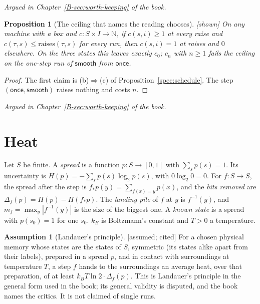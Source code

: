 \documentclass[11pt, a4paper]{article}
\theoremstyle{plain}
\newtheorem{proposition}[theorem]{Proposition}
\theoremstyle{definition}
\newtheorem{assumption}[theorem]{Assumption}
\theoremstyle{remark}
\newcommand{\N}{\mathbb{N}}
\newcommand{\cost}{c}
\newcommand{\inv}{^{-1}}
\newcommand{\argued}[1]{\par\noindent\textit{Argued in Chapter~\ref{B-#1} of the book.}\par}
\newcommand{\kind}[1]{\textup{[#1]}}
\begin{document}
\argued{sec:worth-keeping}

\begin{proposition}[The ceiling that names the reading chooses]\label{spec:ceiling-chooses} \kind{shown}
On any machine with a box and $\cost:S\times I\to\N$, if $\cost(s,i)\ge1$ at every raise and
$\cost(\tau,s)\le\mathrm{raises}(\tau,s)$ for every run, then $\cost(s,i)=1$ at raises and $0$ elsewhere.
On the three states this leaves exactly $\cost_0$; $\cost_n$ with $n\ge1$ fails the ceiling on the
one-step run of $\mathsf{smooth}$ from $\mathsf{once}$.
\end{proposition}

\begin{proof}
The first claim is (b)$\Rightarrow$(c) of Proposition~\ref{spec:schedule}. The step
$(\mathsf{once},\mathsf{smooth})$ raises nothing and costs $n$.
\end{proof}

\argued{sec:worth-keeping}

\section{Heat}\label{spec:ch20}

Let $S$ be finite. A \emph{spread} is a function $p:S\to[0,1]$ with $\sum_s p(s)=1$. Its uncertainty is
$H(p)=-\sum_s p(s)\log_2 p(s)$, with $0\log_2 0=0$. For $f:S\to S$, the spread after the step is
$f_*p(y)=\sum_{f(x)=y}p(x)$, and the \emph{bits removed} are $\Delta_f(p)=H(p)-H(f_*p)$. The \emph{landing
pile} of $f$ at $y$ is $f\inv(y)$, and $m_f=\max_y|f\inv(y)|$ is the size of the biggest one. A
\emph{known state} is a spread with $p(s_0)=1$ for one $s_0$. $k_B$ is Boltzmann's constant and $T>0$ a
temperature.

\begin{assumption}[Landauer's principle]\label{spec:landauer} \kind{assumed; cited}
For a chosen physical memory whose states are the states of $S$, symmetric (its states alike apart from
their labels), prepared in a spread $p$, and in contact with surroundings at temperature $T$, a step $f$
hands to the surroundings an average heat, over that preparation, of at least
$k_BT\ln2\cdot\Delta_f(p)$. This is Landauer's principle in the general form used in the book; its general
validity is disputed, and the book names the critics. It is not claimed of single runs.
\end{assumption}
\end{document}
